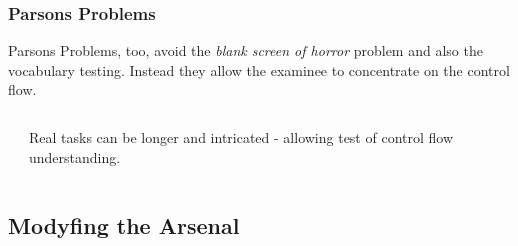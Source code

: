\begin{frame}
  \frametitle{Parsons Problems}
  Parsons Problems, too, avoid the \emph{blank screen of horror} problem and also the vocabulary testing. Instead they allow the examinee to concentrate on the control flow. 
  \vspace{-.5em}
  \begin{columns}
    \begin{column}{.7\textwidth}
    \end{column}
    \begin{column}{.3\textwidth}
      Real tasks can be longer and intricated - allowing test of control flow understanding.
    \end{column}
  \end{columns}
  \vspace{-.5em}
\end{frame}

\subsection{Modyfing the Arsenal}

